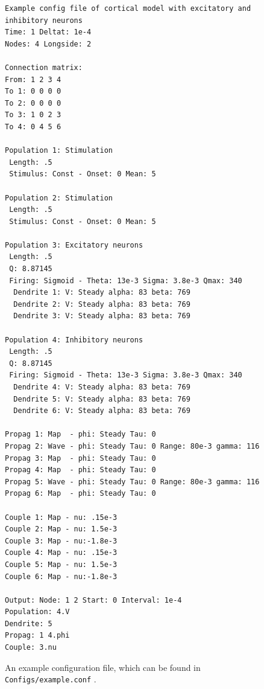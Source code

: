 \documentclass[12pt,a4paper]{article}
\newcommand{\type}[1]{ {\small\small\tt #1} }
\begin{document}
\begin{figure}\begin{center}
	\begin{lstlisting}
Example config file of cortical model with excitatory and inhibitory neurons
Time: 1 Deltat: 1e-4
Nodes: 4 Longside: 2

Connection matrix:
From: 1 2 3 4
To 1: 0 0 0 0
To 2: 0 0 0 0
To 3: 1 0 2 3
To 4: 0 4 5 6

Population 1: Stimulation
 Length: .5
 Stimulus: Const - Onset: 0 Mean: 5

Population 2: Stimulation
 Length: .5
 Stimulus: Const - Onset: 0 Mean: 5

Population 3: Excitatory neurons
 Length: .5
 Q: 8.87145
 Firing: Sigmoid - Theta: 13e-3 Sigma: 3.8e-3 Qmax: 340
  Dendrite 1: V: Steady alpha: 83 beta: 769
  Dendrite 2: V: Steady alpha: 83 beta: 769
  Dendrite 3: V: Steady alpha: 83 beta: 769

Population 4: Inhibitory neurons
 Length: .5
 Q: 8.87145
 Firing: Sigmoid - Theta: 13e-3 Sigma: 3.8e-3 Qmax: 340
  Dendrite 4: V: Steady alpha: 83 beta: 769
  Dendrite 5: V: Steady alpha: 83 beta: 769
  Dendrite 6: V: Steady alpha: 83 beta: 769

Propag 1: Map  - phi: Steady Tau: 0
Propag 2: Wave - phi: Steady Tau: 0 Range: 80e-3 gamma: 116
Propag 3: Map  - phi: Steady Tau: 0
Propag 4: Map  - phi: Steady Tau: 0
Propag 5: Wave - phi: Steady Tau: 0 Range: 80e-3 gamma: 116
Propag 6: Map  - phi: Steady Tau: 0

Couple 1: Map - nu: .15e-3
Couple 2: Map - nu: 1.5e-3
Couple 3: Map - nu:-1.8e-3
Couple 4: Map - nu: .15e-3
Couple 5: Map - nu: 1.5e-3
Couple 6: Map - nu:-1.8e-3

Output: Node: 1 2 Start: 0 Interval: 1e-4
Population: 4.V
Dendrite: 5
Propag: 1 4.phi
Couple: 3.nu
	\end{lstlisting}
\end{center}
\caption{An example configuration file, which can be found in \type{Configs/example.conf}.}
\end{figure}
\end{document}
